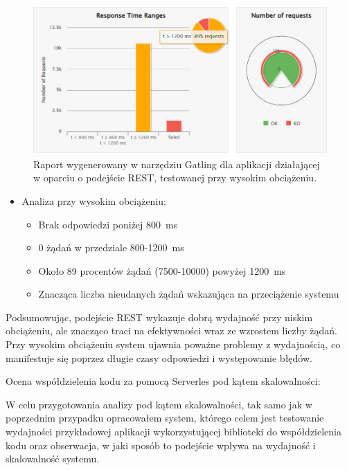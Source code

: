 \documentclass[runningheads,12pt]{llncs}
\begin{document}
\begin{figure}
    \includegraphics[width=\linewidth]{images/rest-gatling-high-graph.jpg}
    \caption{Raport wygenerowany w narzędziu Gatling dla aplikacji działającej w oparciu o podejście REST, testowanej przy wysokim obciążeniu.} \label{fig3}
\end{figure}

\begin{itemize}
  \item Analiza przy wysokim obciążeniu:
  \begin{itemize}
    \item Brak odpowiedzi poniżej 800~ms
    \item 0 żądań w przedziale 800-1200~ms
    \item Około 89 procentów żądań (7500-10000) powyżej 1200~ms
    \item Znacząca liczba nieudanych żądań wskazująca na przeciążenie systemu
  \end{itemize}
\end{itemize}

Podsumowując, podejście REST wykazuje dobrą wydajność przy niskim obciążeniu, ale znacząco traci na efektywności wraz ze wzrostem liczby żądań. Przy wysokim obciążeniu system ujawnia poważne problemy z wydajnością, co manifestuje się poprzez długie czasy odpowiedzi i występowanie błędów.

\newpage



Ocena współdzielenia kodu za pomocą Serverles pod kątem skalowalności:

W celu przygotowania analizy pod kątem skalowalności, tak samo jak w poprzednim przypadku opracowałem system, którego celem jest testowanie wydajności przykładowej aplikacji wykorzystującej biblioteki do współdzielenia kodu oraz obserwacja, w jaki sposób to podejście wpływa na wydajność i skalowalność systemu.
\end{document}

